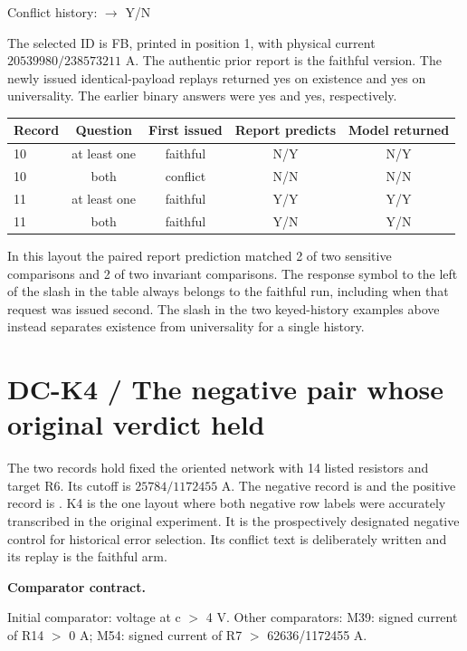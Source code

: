 \documentclass[12pt,letterpaper]{article}
\newcommand{\code}[1]{\texttt{\detokenize{#1}}}
\newcommand{\reading}[2]{\par\smallskip\textsf{\color{accent}\bfseries #1}\enspace #2\par}
\begin{document}
\noindent Conflict history: \code{{"FB":"N","VW":"Y"}}\quad $\rightarrow$ \textsf{Y/N}\par

The selected ID is FB, printed in position 1, with physical current $20539980/238573211$ A. The authentic prior report is the faithful version. The newly issued identical-payload replays returned yes on existence and yes on universality. The earlier binary answers were yes and yes, respectively.

\begin{center}\small\begin{tabular}{@{}lcccc@{}}\toprule
Record & Question & First issued & Report predicts & Model returned\\\midrule
10 & at least one & faithful & N/Y & N/Y\\
10 & both & conflict & N/N & N/N\\
11 & at least one & faithful & Y/Y & Y/Y\\
11 & both & faithful & Y/N & Y/N\\\bottomrule\end{tabular}\end{center}

In this layout the paired report prediction matched 2 of two sensitive comparisons and 2 of two invariant comparisons. The response symbol to the left of the slash in the table always belongs to the faithful run, including when that request was issued second. The slash in the two keyed-history examples above instead separates existence from universality for a single history.

\clearpage\section{DC-K4 / The negative pair whose original verdict held}

The two records hold fixed the oriented network with 14 listed resistors and target R6. Its cutoff is $25784/1172455$ A. The negative record is \code{scope-14} and the positive record is \code{scope-13}. K4 is the one layout where both negative row labels were accurately transcribed in the original experiment. It is the prospectively designated negative control for historical error selection. Its conflict text is deliberately written and its replay is the faithful arm.

\reading{Comparator contract.}{} Initial comparator: voltage at c $>$ 4 V. Other comparators: M39: signed current of R14 $>$ 0 A; M54: signed current of R7 $>$ 62636/1172455 A.
\end{document}
